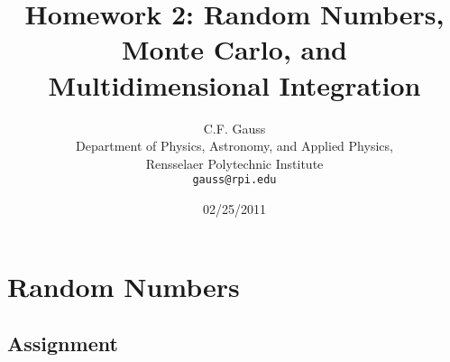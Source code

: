 \documentclass{report}
\begin{document}
\title{\textbf{Homework 2:} Random Numbers, Monte Carlo, and Multidimensional Integration}
\author{C.F. Gauss\\
  Department of Physics, Astronomy, and Applied Physics,\\
  Rensselaer Polytechnic Institute\\
  \texttt{gauss@rpi.edu}}
 \date{02/25/2011}
 \renewcommand{\chaptername}{Assignment}
 \setcounter {chapter}{1}
\maketitle
\chapter{Random Numbers}
\section{Assignment}
\end{document}
